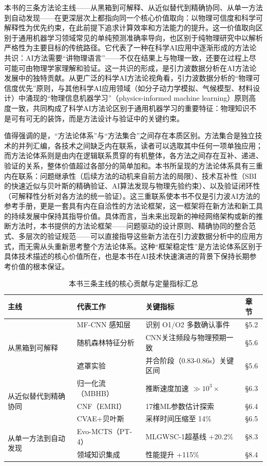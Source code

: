 本书的三条方法论主线——从黑箱到可解释、从近似替代到精确协同、从单一方法到自动发现——在更深层次上都指向同一个核心价值取向：以物理可信度和科学可解释性为优先约束，在此前提下追求计算效率和方法能力的提升。这一价值取向区别于通用机器学习领域常见的单纯预测准确率导向，也区别于纯物理研究中以解析严格性为主要目标的传统路径。它代表了一种在科学AI应用中逐渐形成的方法论共识：AI方法需要“讲物理语言”——不仅在结果上与物理一致，还要在过程上尽可能可由物理学家理解和验证。这一共识的形成，是引力波数据分析在AI方法论发展中的独特贡献。从更广泛的科学AI方法论视角看，引力波数据分析的“物理可信度优先”原则，与其他科学AI应用领域（如分子动力学模拟、气候模型、材料设计）中涌现的“物理信息机器学习”（physics-informed machine learning）原则高度一致，共同构成了科学AI方法论区别于通用机器学习的重要特征：物理知识不是可有可无的装饰，而是方法设计与验证中的关键约束。

值得强调的是，“方法论体系”与“方法集合”之间存在本质区别。方法集合是独立技术的并列汇编，各技术之间缺乏内在联系，读者可以选取其中任何一项单独应用；而方法论体系则是由内在逻辑联系贯穿的有机整体，各方法之间存在互补、递进、验证的关系，整体价值超过各部分的简单加和。本书所呈现的方法论体系具有三重内在联系：问题继承性（后续方法的动机来自前方法的局限）、技术互补性（SBI的快速近似与贝叶斯的精确验证、AI算法发现与物理先验约束）、以及验证闭环性（可解释性分析对各方法的统一验证）。这三重联系使本书不仅是引力波AI方法的参考手册，更是一套具有内在自洽性的方法论框架，这一框架将在新方法和新工具的持续发展中保持其指导价值。具体而言，当未来出现新的神经网络架构或新的推断方法时，本书提供的方法论框架——问题驱动的设计原则、精确协同的整合范式、多层次的验证规范——可以直接指导这些新方法在引力波数据分析中的应用方式，而无需从头重新思考整个方法论体系。这种“框架稳定性”是方法论体系区别于具体技术描述的核心价值所在，也是本书在AI技术快速演进的背景下保持长期参考价值的根本保证。

\begin{table}[htbp]
\centering
\caption{本书三条主线的核心贡献与定量指标汇总}
\label{tab:contributions}
\small
\begin{tabular}{llll}
\hline
\textbf{主线} & \textbf{代表工作} & \textbf{关键指标} & \textbf{章节} \\
\hline
\multirow{3}{*}{从黑箱到可解释}
  & MF-CNN 感知层 & 识别 O1/O2 多数确认事件 & §5.2 \\
  & 随机森林特征分析 & CNN关注频段与物理预期一致 & §5.6 \\
  & 遮罩实验 & 并合阶段（0.83-0.86s）关键区间 & §5.6 \\
\hline
\multirow{3}{*}{从近似替代到精确协同}
  & 归一化流（MBHB） & 推断速度加速 $\gg 10^3\times$ & §6.3 \\
  & CNF（EMRI）& 17维ML参数估计探索 & §6.4 \\
  & CVAE+贝叶斯 & 采样时间压缩至 14\% & §6.5 \\
\hline
\multirow{2}{*}{从单一方法到自动发现}
  & Evo-MCTS（PT-4） & MLGWSC-1超基线 +20.2\% & §8.3 \\
  & 领域知识集成 & 性能提升 +115\% & §8.4 \\
\hline
\end{tabular}
\end{table}

